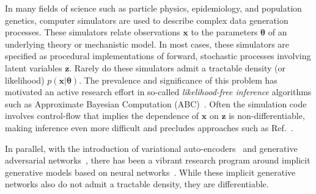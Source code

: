 \documentclass[twocolumn,superscriptaddress,aps]{revtex4-1}
\newcommand{\kcnote}[1]{\textcolor{red}{[KC: #1]}}
\newcommand{\bftheta}{{\bm \theta}}
\newcommand{\bfx}{\mathbf{x}}
\newcommand{\bfz}{\mathbf{z}}
\theoremstyle{plain}
\begin{document}
In many fields of science such as particle physics, epidemiology,  and population
genetics, computer simulators are used to describe complex data generation processes. These simulators relate
observations $\bfx$ to the parameters $\bftheta$ of an underlying theory or mechanistic model.
In most cases, these simulators are specified as procedural implementations of forward, stochastic processes involving latent variables $\bfz$.
Rarely do these simulators admit a tractable density (or likelihood) $p(\bfx |
\bftheta)$. The prevalence and significance of this problem has motivated an
active research effort in so-called \textit{likelihood-free inference}
algorithms such as Approximate Bayesian Computation
(ABC)~\cite{beaumont2002approximate, marjoram2003markov, sisson2007sequential,
sisson2011likelihood, marin2012approximate, cranmer2015approximating}.  Often
the simulation code involves control-flow that implies the dependence of $\bfx$
on $\bfz$ is non-differentiable, making inference even more difficult and
precludes approaches such as Ref.~\citep{2016arXiv160507826G}.




In parallel, with the introduction of variational
auto-encoders~\citep{DBLP:journals/corr/KingmaW13} and generative adversarial
networks~\cite{goodfellow2014generative}, there has been a vibrant research
program around implicit generative models based on neural
networks~\citep{2016arXiv161003483M}.  While these implicit generative networks
also do not admit a tractable density, they are differentiable.


\end{document}
